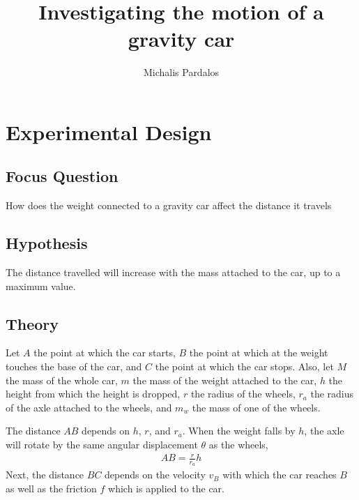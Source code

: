 \documentclass[titlepage,12pt]{article}
\title{Investigating the motion of a gravity car}
\author{Michalis Pardalos}
\date{}
\begin{document}
\maketitle
\section{Experimental Design}

\subsection{Focus Question}

How does the weight connected to a gravity car affect the distance it travels

\subsection{Hypothesis}

The distance travelled will increase with the mass attached to the car, up to a maximum
value.

\subsection{Theory}

Let $A$ the point at which the car starts, $B$ the point at which at the weight touches the
base of the car, and $C$ the point at which the car stops. Also, let $M$ the mass of the
whole car, $m$ the mass of the weight attached to the car, $h$ the height from which the
height is dropped, $r$ the radius of the wheels, $r_a$ the radius of the axle attached to
the wheels, and $m_w$ the mass of one of the wheels.

The distance $AB$ depends on $h$, $r$, and $r_a$. When the weight falls by $h$, the axle
will rotate by the same angular displacement $\theta$ as the wheels, 
%
\begin{align*}
    AB = \frac{r}{r_a} h
\end{align*}
%
Next, the distance $BC$ depends on the velocity $v_B$ with which the car reaches $B$ as well
as the friction $f$ which is applied to the car. 
\end{document}
